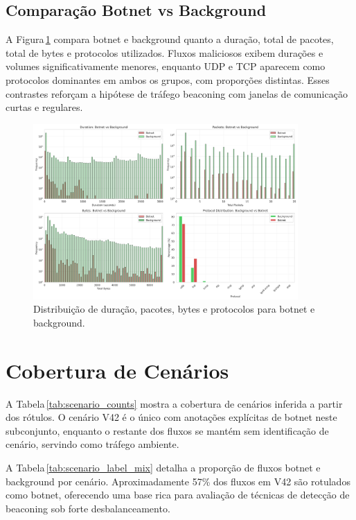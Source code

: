 \documentclass[a4paper, 12pt]{article}
\begin{document}
\subsection{Comparação Botnet vs Background}
A Figura\,\ref{fig:botnet_background} compara botnet e background quanto a duração, total de pacotes, total de bytes e protocolos utilizados. Fluxos maliciosos exibem durações e volumes significativamente menores, enquanto UDP e TCP aparecem como protocolos dominantes em ambos os grupos, com proporções distintas. Esses contrastes reforçam a hipótese de tráfego beaconing com janelas de comunicação curtas e regulares.

\begin{figure}[H]
    \centering
    \includegraphics[width=0.9\textwidth]{botnet_vs_background.png}
    \caption{Distribuição de duração, pacotes, bytes e protocolos para botnet e background.}
    \label{fig:botnet_background}
\end{figure}

\section{Cobertura de Cenários}
A Tabela\,\ref{tab:scenario_counts} mostra a cobertura de cenários inferida a partir dos rótulos. O cenário V42 é o único com anotações explícitas de botnet neste subconjunto, enquanto o restante dos fluxos se mantém sem identificação de cenário, servindo como tráfego ambiente.



A Tabela\,\ref{tab:scenario_label_mix} detalha a proporção de fluxos botnet e background por cenário. Aproximadamente 57\% dos fluxos em V42 são rotulados como botnet, oferecendo uma base rica para avaliação de técnicas de detecção de beaconing sob forte desbalanceamento.
\end{document}
